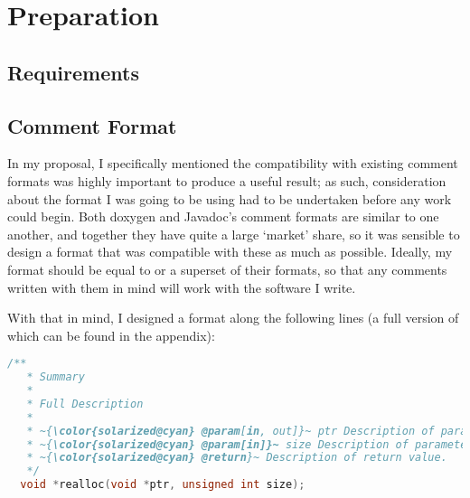 



\chapter{Preparation}
\section{Requirements}

\section{Comment Format}
In my proposal, I specifically mentioned the compatibility with existing comment
formats was highly important to produce a useful result; as such, consideration
about the format I was going to be using had to be undertaken before any work
could begin. Both doxygen and Javadoc's comment formats are similar to one
another, and together they have quite a large `market' share, so it was sensible
to design a format that was compatible with these as much as possible. Ideally,
my format should be equal to or a superset of their formats, so that any
comments written with them in mind will work with the software I write.

With that in mind, I designed a format along the following lines (a full version
of which can be found in the appendix):

\begin{lstlisting}[language=c, escapechar=~]
  /**
   * Summary
   *
   * Full Description
   *
   * ~{\color{solarized@cyan} @param[in, out]}~ ptr Description of parameter ptr
   * ~{\color{solarized@cyan} @param[in]}~ size Description of parameter size
   * ~{\color{solarized@cyan} @return}~ Description of return value.
   */
  void *realloc(void *ptr, unsigned int size);
\end{lstlisting}

